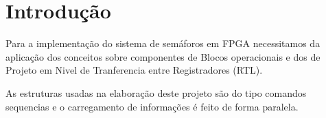 \section{Introdução}
\setlength{\parindent}{2cm}

Para a implementação do sistema de semáforos em FPGA necessitamos da aplicação dos conceitos sobre componentes de Blocos operacionais e dos de Projeto em Nivel de Tranferencia entre Registradores (RTL).

As estruturas usadas na elaboração deste projeto são do tipo comandos sequencias e o carregamento de informações é feito de forma paralela.